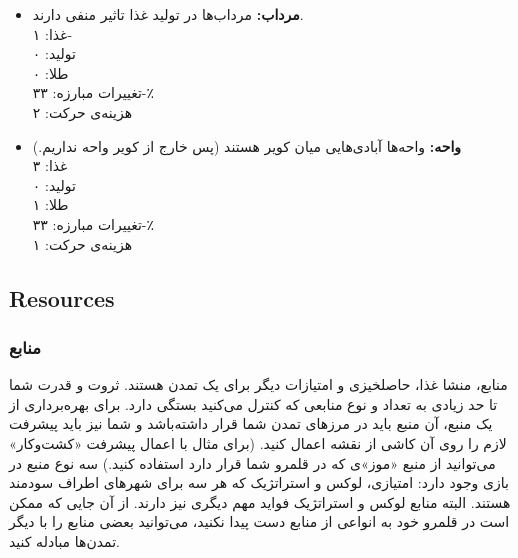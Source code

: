 \documentclass[]{article}
\begin{document}
\begin{itemize}
	\item \textbf{مرداب:} مرداب‌ها در تولید غذا تاثیر منفی دارند.\\
	غذا: ۱-\\
	تولید: ۰\\
	طلا: ۰\\
	تغییرات مبارزه: ۳۳-٪\\
	هزینه‌ی حرکت: ۲
	\item \textbf{واحه:} واحه‌ها آبادی‌هایی میان کویر هستند (پس خارج از کویر واحه نداریم.)\\
	غذا: ۳\\
	تولید: ۰\\
	طلا: ۱\\
	تغییرات مبارزه: ۳۳-٪\\
	هزینه‌ی حرکت: ۱
\end{itemize}
\subsection*{{\titr Resources}}

\subsubsection*{{\titr منابع}}
منابع، منشا غذا، حاصلخیزی و امتیازات دیگر برای یک تمدن هستند. ثروت و قدرت شما تا حد زیادی به تعداد و نوع منابعی که کنترل می‌کنید بستگی دارد. برای بهره‌برداری از یک منبع، آن منبع باید در مرزهای تمدن شما قرار داشته‌باشد و شما نیز باید پیشرفت لازم را روی آن کاشی از نقشه اعمال کنید. (برای مثال با اعمال پیشرفت «کشت‌وکار» می‌توانید از منبع «موز»ی که در قلمرو شما قرار دارد استفاده کنید.)
سه نوع منبع در بازی وجود دارد: امتیازی، لوکس و استراتژیک که هر سه برای شهرهای اطراف سودمند هستند. البته منابع لوکس و استراتژیک فواید مهم دیگری نیز دارند.
از آن جایی که ممکن است در قلمرو خود به انواعی از منابع دست پیدا نکنید، می‌توانید بعضی منابع را با دیگر تمدن‌ها مبادله کنید.
\end{document}
